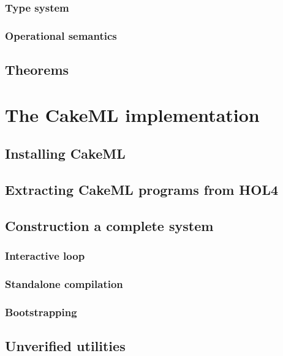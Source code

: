 \documentclass[12pt,a4paper]{book}
\begin{document}
\section{Type system}

\section{Operational semantics}

\chapter{Theorems}


\part{The CakeML implementation}

\chapter{Installing CakeML}

\chapter{Extracting CakeML programs from HOL4}

\chapter{Construction a complete system}

\section{Interactive loop}

\section{Standalone compilation}

\section{Bootstrapping}

\chapter{Unverified utilities}
\end{document}
